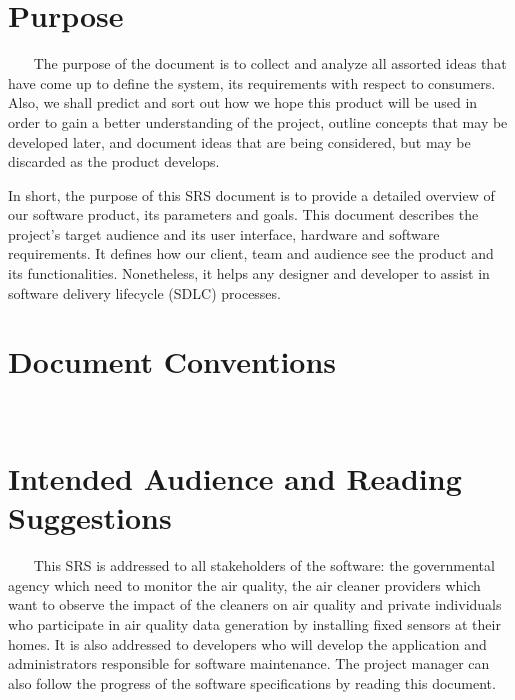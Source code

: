 \documentclass{report}
\begin{document}
\section{Purpose} ~~~
The purpose of the document is to collect and analyze all assorted ideas that
have come up to define the system, its requirements with respect to consumers.
Also, we shall predict and sort out how we hope this product will be used in
order to gain a better understanding of the project, outline concepts that may
be developed later, and document ideas that are being considered, but may be
discarded as the product develops.

In short, the purpose of this SRS document is to provide a detailed overview
of our software product, its parameters and goals. This document describes the
project's target audience and its user interface, hardware and software
requirements. It defines how our client, team and audience see the product
and its functionalities. Nonetheless, it helps any designer and developer to
assist in software delivery lifecycle (SDLC) processes.


\section{Document Conventions} ~~~

\section{Intended Audience and Reading Suggestions} ~~~
This SRS is addressed to all stakeholders of the software: the governmental
agency which need to monitor the air quality, the air cleaner providers which
want to observe the impact of the cleaners on air quality and private individuals
who participate in air quality data generation by installing fixed sensors at
their homes. It is also addressed to developers who will develop the application
and administrators responsible for software maintenance. The project manager
can also follow the progress of the software specifications by reading this
document.
\end{document}

